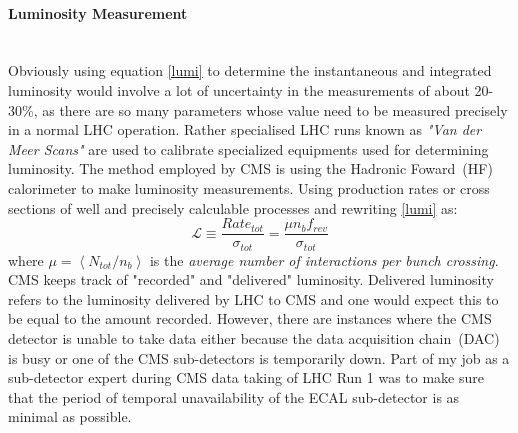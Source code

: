 \paragraph*{Luminosity Measurement}\mbox{}\\
Obviously using equation \eqref{lumi} to determine the instantaneous and integrated luminosity would involve a lot of uncertainty in the measurements of about 20-30\%, as there are so many parameters whose value need to be measured precisely in a normal LHC operation. Rather specialised LHC runs known as \textit{"Van der Meer Scans"}\cite{lhclumi} are used to calibrate specialized equipments used for determining luminosity.
The method employed by CMS is using the Hadronic Foward~(HF) calorimeter to make luminosity measurements.
Using production rates or cross sections of well and precisely calculable processes and rewriting \eqref{lumi} as:
\begin{equation}
 \mathscr{L} \equiv \frac{Rate_{tot}}{\sigma_{tot}}    = \frac{\mu \mathit{n}_{b} f_{rev}}{\sigma_{tot}} 
\end{equation}
where $\mu = \left\langle \mathit{N}_{tot}/ \mathit{n}_{b} \right\rangle $ is the \textit{average number of interactions per bunch crossing}.
CMS keeps track of "recorded" and "delivered" luminosity. Delivered luminosity refers to the luminosity delivered by LHC to CMS and one would expect this to be equal to  the amount recorded. However, there are instances where the CMS detector is unable to take data either because the data acquisition chain~(DAC) is busy or one of the CMS sub-detectors is temporarily down. Part of my job as a sub-detector expert during CMS data taking of LHC Run 1 was to make sure that the period of temporal unavailability of the ECAL sub-detector is as minimal as possible.
\begin{center}
\centering
\mbox{
}
\label{fig:cmslumi}
\end{center}

  
